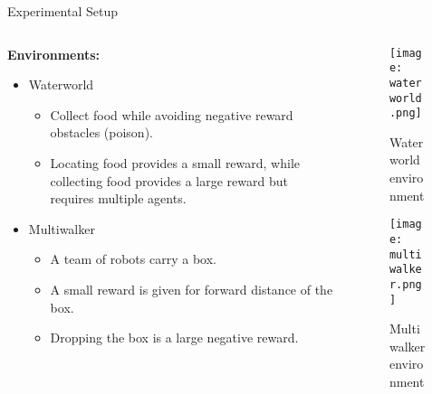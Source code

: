 \begin{frame}{Experimental Setup}
\begin{columns}
    \begin{column}{0.5\textwidth}
        \textbf{Environments:}
        \begin{itemize}
            \item Waterworld
            \begin{itemize}
                \item Collect food while avoiding negative reward obstacles (poison).
                \item Locating food provides a small reward, 
                    while collecting food provides a large reward but requires multiple agents.
            \end{itemize}
            \item Multiwalker
            \begin{itemize}
                \item A team of robots carry a box.
                \item A small reward is given for forward distance of the box.
                \item Dropping the box is a large negative reward.
            \end{itemize}
        \end{itemize}
        \vfil
    \end{column}
    \begin{column}{0.5\textwidth}
        \begin{figure}
            \texttt{[image: waterworld.png]}
            \caption{Waterworld environment}
        \end{figure}
        \vspace{-1em}
        \begin{figure}
            \texttt{[image: multiwalker.png]}
            \caption{Multiwalker environment}
        \end{figure}
    \end{column}
\end{columns}
\end{frame}



